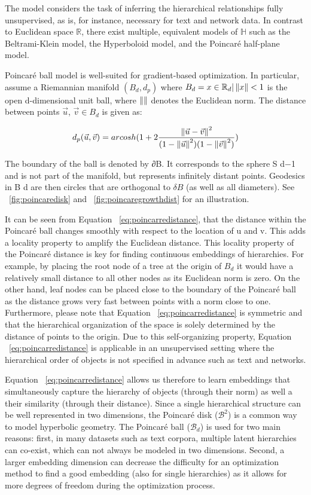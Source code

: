 The model considers the task of inferring the hierarchical relationships fully unsupervised, as is, for instance, necessary for text and network data. In contrast to Euclidean space $ \mathbb{R}$, there exist multiple, equivalent models of $ \mathbb{H}$ such as the Beltrami-Klein model, the Hyperboloid model, and the Poincaré half-plane model. 

Poincaré ball model is well-suited for gradient-based optimization. In particular, assume a Riemannian manifold $(B_d , d_p )$ where  $B_d = {x \in \mathbb{R}_d | \norm{x} < 1}$ is the open d-dimensional unit ball, where $\norm{}$ denotes the Euclidean norm. The distance between points $\Vec{u}$, $\Vec{v} \in B_d$ is given as:

\begin{equation} \label{eq:poincarredistance}
    d_p(\Vec{u},\Vec{v})= arcosh(1+2 \dfrac{\norm{\Vec{u}-\Vec{v}}^2}{(1-\norm{\Vec{u}}^2)(1-\norm{\Vec{v}}^2)})
\end{equation}

 The boundary of the ball is denoted by ∂B. It corresponds to the sphere S d−1 and is not part of the manifold, but represents infinitely distant points. Geodesics in B d are then circles that are orthogonal to $\delta B$ (as well as all diameters). See ~\ref{fig:poincaredisk} and ~\ref{fig:poincaregrowthdist} for an illustration.

It can be seen from Equation ~\ref{eq:poincarredistance}, that the distance within the Poincaré ball changes smoothly with
respect to the location of u and v. This adds a locality property to amplify the Euclidean distance. This locality property of the Poincaré distance is key for finding continuous embeddings of hierarchies. For example, by placing the root node of a tree at the origin of $B_d$ it would have a relatively small distance to all other nodes as its Euclidean norm is zero. On the other hand, leaf nodes can be placed close to the boundary of the Poincaré ball as the distance grows very fast between points with a norm close to one. Furthermore, please note that Equation ~\ref{eq:poincarredistance} is symmetric and that the hierarchical organization of the space is solely determined by the distance of points to the origin. Due to this self-organizing property, Equation ~\ref{eq:poincarredistance} is applicable in an unsupervised setting where the hierarchical order of objects is not specified in advance such as text and networks.

Equation ~\ref{eq:poincarredistance} allows us therefore to learn embeddings that simultaneously capture the hierarchy of objects (through their norm) as well a their similarity (through their distance). Since a single hierarchical structure can be well represented in two dimensions, the Poincaré disk ($ \mathcal{B}^2 $) is a common way to model hyperbolic geometry. The Poincaré ball ($ \mathcal{B}_d $) is used for two main reasons: first, in many datasets such as text corpora, multiple latent hierarchies can co-exist, which can not always be modeled in two dimensions. Second, a larger embedding dimension can decrease the difficulty for an optimization method to find a good embedding (also for single hierarchies) as it allows for more degrees of freedom during the optimization process. 

